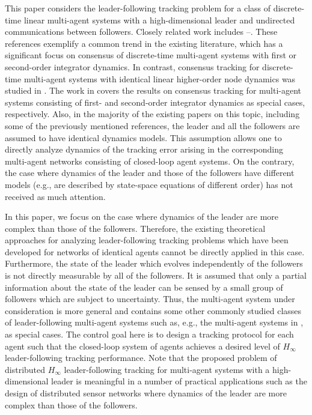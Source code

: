 \documentclass[a4paper,10pt,onecolumn]{article}
\begin{document}
 This paper considers the leader-following tracking problem
 for a class of discrete-time linear multi-agent systems with a high-dimensional
 leader and undirected communications between followers. Closely related
 work includes 
 \cite{Cao-Automatica-2009}--\cite{Zhongkui-DCDB}.
These references exemplify a common
trend in the existing literature, which has a significant focus on
consensus of discrete-time multi-agent systems with first or second-order
integrator dynamics. In contrast, consensus tracking for discrete-time
multi-agent systems with identical linear higher-order node dynamics was studied in
\cite{KeyouRNC,Zhongkui-DCDB}. The work in \cite{KeyouRNC,Zhongkui-DCDB} covers the results on consensus tracking
for multi-agent systems consisting of first- and second-order integrator dynamics as special cases, respectively.
Also, in the majority of the existing papers on this topic, including some
of the previously mentioned references,
the leader and all the followers are assumed to have identical dynamics models.
This assumption allows one to directly analyze dynamics of the tracking error
arising in the corresponding multi-agent networks consisting of closed-loop
agent systems. On the contrary, the case where dynamics of the leader and
those of the followers have different models (e.g., are described by
state-space equations of different order) has not received as much attention.


In this paper, we focus on the case where dynamics of the leader are more
complex than those of the followers. Therefore, the existing theoretical
approaches for analyzing leader-following tracking problems which have been
developed for networks of identical agents cannot be directly applied in
this case. Furthermore, the state of the leader which evolves independently of
the followers is not directly measurable by all of the followers. It is
assumed that only a partial information about the state of the
leader can be sensed by a small group of followers which are subject to
uncertainty. Thus, the multi-agent system under consideration is more general
and contains some other commonly studied classes of leader-following
multi-agent systems such as, e.g., the multi-agent systems in
\cite{Zhongkui-DCDB}, as special cases. The control goal here is to design
a tracking protocol for each agent such that the closed-loop system of
agents achieves a desired level of $H_{\infty}$ leader-following tracking
performance. Note that the proposed problem of distributed $H_{\infty}$
leader-following tracking for multi-agent systems with a high-dimensional
leader is meaningful in a number of practical applications such as the
design of distributed sensor networks \cite{Fang-WCICA2012} where
dynamics of the leader are more complex than those of the followers.
\end{document}
